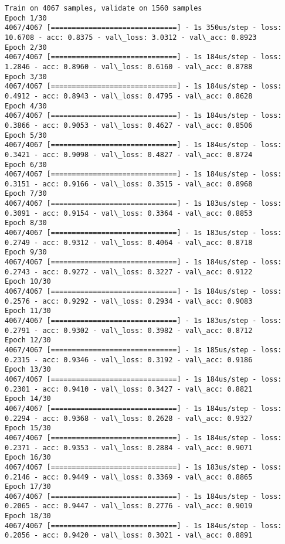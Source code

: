 \documentclass[11pt]{article}
\begin{document}
    \begin{Verbatim}[commandchars=\\\{\}]
Train on 4067 samples, validate on 1560 samples
Epoch 1/30
4067/4067 [==============================] - 1s 350us/step - loss: 10.6708 - acc: 0.8375 - val\_loss: 3.0312 - val\_acc: 0.8923
Epoch 2/30
4067/4067 [==============================] - 1s 184us/step - loss: 1.2846 - acc: 0.8960 - val\_loss: 0.6160 - val\_acc: 0.8788
Epoch 3/30
4067/4067 [==============================] - 1s 184us/step - loss: 0.4912 - acc: 0.8943 - val\_loss: 0.4795 - val\_acc: 0.8628
Epoch 4/30
4067/4067 [==============================] - 1s 184us/step - loss: 0.3866 - acc: 0.9053 - val\_loss: 0.4627 - val\_acc: 0.8506
Epoch 5/30
4067/4067 [==============================] - 1s 184us/step - loss: 0.3421 - acc: 0.9098 - val\_loss: 0.4827 - val\_acc: 0.8724
Epoch 6/30
4067/4067 [==============================] - 1s 184us/step - loss: 0.3151 - acc: 0.9166 - val\_loss: 0.3515 - val\_acc: 0.8968
Epoch 7/30
4067/4067 [==============================] - 1s 183us/step - loss: 0.3091 - acc: 0.9154 - val\_loss: 0.3364 - val\_acc: 0.8853
Epoch 8/30
4067/4067 [==============================] - 1s 183us/step - loss: 0.2749 - acc: 0.9312 - val\_loss: 0.4064 - val\_acc: 0.8718
Epoch 9/30
4067/4067 [==============================] - 1s 184us/step - loss: 0.2743 - acc: 0.9272 - val\_loss: 0.3227 - val\_acc: 0.9122
Epoch 10/30
4067/4067 [==============================] - 1s 184us/step - loss: 0.2576 - acc: 0.9292 - val\_loss: 0.2934 - val\_acc: 0.9083
Epoch 11/30
4067/4067 [==============================] - 1s 183us/step - loss: 0.2791 - acc: 0.9302 - val\_loss: 0.3982 - val\_acc: 0.8712
Epoch 12/30
4067/4067 [==============================] - 1s 185us/step - loss: 0.2315 - acc: 0.9346 - val\_loss: 0.3192 - val\_acc: 0.9186
Epoch 13/30
4067/4067 [==============================] - 1s 184us/step - loss: 0.2301 - acc: 0.9410 - val\_loss: 0.3427 - val\_acc: 0.8821
Epoch 14/30
4067/4067 [==============================] - 1s 184us/step - loss: 0.2294 - acc: 0.9368 - val\_loss: 0.2628 - val\_acc: 0.9327
Epoch 15/30
4067/4067 [==============================] - 1s 184us/step - loss: 0.2371 - acc: 0.9353 - val\_loss: 0.2884 - val\_acc: 0.9071
Epoch 16/30
4067/4067 [==============================] - 1s 183us/step - loss: 0.2146 - acc: 0.9449 - val\_loss: 0.3369 - val\_acc: 0.8865
Epoch 17/30
4067/4067 [==============================] - 1s 184us/step - loss: 0.2065 - acc: 0.9447 - val\_loss: 0.2776 - val\_acc: 0.9019
Epoch 18/30
4067/4067 [==============================] - 1s 184us/step - loss: 0.2056 - acc: 0.9420 - val\_loss: 0.3021 - val\_acc: 0.8891

\end{Verbatim}
\end{document}
